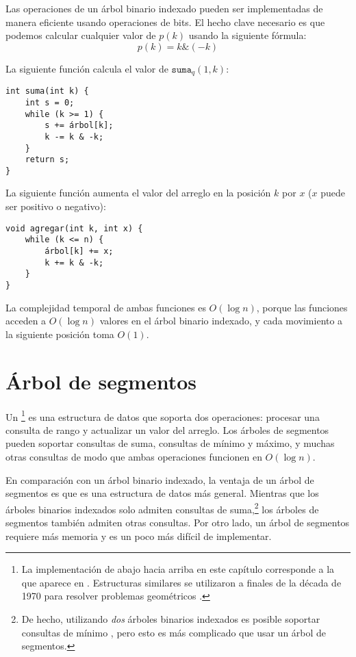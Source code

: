 Las operaciones de un árbol binario indexado pueden ser
implementadas de manera eficiente usando operaciones de bits.
El hecho clave necesario es que podemos
calcular cualquier valor de $p(k)$ usando la siguiente fórmula:
\[p(k) = k \& (-k)\]

La siguiente función calcula el valor de $\texttt{suma}_q(1,k)$:
\begin{lstlisting}
int suma(int k) {
    int s = 0;
    while (k >= 1) {
        s += árbol[k];
        k -= k & -k;
    }
    return s;
}
\end{lstlisting}

\newpage
La siguiente función aumenta el
valor del arreglo en la posición $k$ por $x$
($x$ puede ser positivo o negativo):

\begin{lstlisting}
void agregar(int k, int x) {
    while (k <= n) {
        árbol[k] += x;
        k += k & -k;
    }
}
\end{lstlisting}

La complejidad temporal de ambas funciones es
$O(\log n)$, porque las funciones acceden a $O(\log n)$
valores en el árbol binario indexado, y cada movimiento
a la siguiente posición toma $O(1)$.

\section{Árbol de segmentos}


Un \footnote{La implementación de abajo hacia arriba en este capítulo corresponde
    a la que aparece en \cite{sta06}. Estructuras similares se utilizaron
    a finales de la década de 1970 para resolver problemas geométricos \cite{ben80}.} es una estructura de datos
que soporta dos operaciones:
procesar una consulta de rango y
actualizar un valor del arreglo.
Los árboles de segmentos pueden soportar
consultas de suma, consultas de mínimo y máximo, y muchas otras
consultas de modo que ambas operaciones funcionen en $O(\log n)$.

En comparación con un árbol binario indexado,
la ventaja de un árbol de segmentos es que es
una estructura de datos más general.
Mientras que los árboles binarios indexados solo admiten
consultas de suma,\footnote{De hecho, utilizando \emph{dos} árboles
    binarios indexados es posible soportar consultas de mínimo \cite{dim15},
    pero esto es más complicado que usar un árbol de segmentos.}
los árboles de segmentos también admiten otras consultas.
Por otro lado, un árbol de segmentos requiere más
memoria y es un poco más difícil de implementar.

